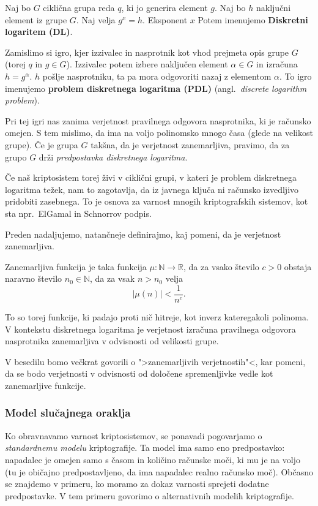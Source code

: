 \documentclass[isrm2, tisk]{fmfdelo}
\newcommand{\R}{\mathbb R}
\newcommand{\N}{\mathbb N}
\begin{document}
\begin{definicija}
\label{def:dl}
    Naj bo $G$ ciklična grupa reda $q$, ki jo generira element $g$. Naj bo $h$ naključni element iz 
    grupe $G$. Naj velja $g^x = h$. Eksponent $x$ Potem imenujemo \textbf{Diskretni logaritem (DL)}.

    Zamislimo si igro, kjer izzivalec in nasprotnik kot vhod prejmeta opis grupe $G$ (torej $q$ in 
    $g \in G$). Izzivalec potem izbere naključen element $\alpha \in G$ in izračuna $h = g^{\alpha}$.
    $h$ pošlje nasprotniku, ta pa mora odgovoriti nazaj z elementom $\alpha$. To igro imenujemo 
    \textbf{problem diskretnega logaritma (PDL)} (angl.\ \textit{discrete logarithm problem}).

    Pri tej igri nas zanima verjetnost pravilnega odgovora nasprotnika, ki je računsko omejen. S tem 
    mislimo, da ima na voljo polinomsko mnogo časa (glede na velikost grupe). Če je grupa $G$ takšna, 
    da je verjetnost zanemarljiva, pravimo, da za grupo $G$ drži \textit{predpostavka diskretnega 
    logaritma}.
\end{definicija}

Če naš kriptosistem torej živi v ciklični grupi, v kateri je problem diskretnega logaritma težek,
nam to zagotavlja, da iz javnega ključa ni računsko izvedljivo pridobiti zasebnega. To je osnova
za varnost mnogih kriptografskih sistemov, kot sta npr.\ ElGamal in Schnorrov podpis.

Preden nadaljujemo, natančneje definirajmo, kaj pomeni, da je verjetnost zanemarljiva.

\begin{definicija}
    Zanemarljiva funkcija je taka funkcija $\mu : \N \rightarrow \R$, da za vsako število
    $c > 0$ obstaja naravno število $n_0 \in \N$, da za vsak $n > n_0$ velja
    $$
    |\mu(n)| < \frac{1}{n^c}.
    $$
\end{definicija}

To so torej funkcije, ki padajo proti nič hitreje, kot inverz kateregakoli polinoma. V kontekstu
diskretnega logaritma je verjetnost izračuna pravilnega odgovora nasprotnika zanemarljiva v
odvisnosti od velikosti grupe.

V besedilu bomo večkrat govorili o ">zanemarljivih verjetnostih"<, kar pomeni, da se bodo
verjetnosti v odvisnosti od določene spremenljivke vedle kot zanemarljive funkcije.

\subsubsection{Model slučajnega oraklja}
Ko obravnavamo varnost kriptosistemov, se ponavadi pogovarjamo o \textit{standardnemu modelu} kriptografije. 
Ta model ima samo eno predpostavko: napadalec je omejen samo s časom in količino računske moči, ki mu 
je na voljo (tu je običajno predpostavljeno, da ima napadalec realno računsko moč). Občasno se znajdemo 
v primeru, ko moramo za dokaz varnosti sprejeti dodatne predpostavke. V tem primeru govorimo o 
alternativnih modelih kriptografije. 
\end{document}
